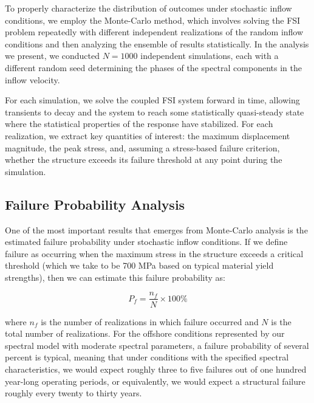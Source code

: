 ﻿\documentclass[a4paper,11pt]{article}
\theoremstyle{definition}
\begin{document}
To properly characterize the distribution of outcomes under stochastic inflow conditions, we employ the Monte-Carlo method, which involves solving the FSI problem repeatedly with different independent realizations of the random inflow conditions and then analyzing the ensemble of results statistically. In the analysis we present, we conducted $N = 1000$ independent simulations, each with a different random seed determining the phases of the spectral components in the inflow velocity.

For each simulation, we solve the coupled FSI system forward in time, allowing transients to decay and the system to reach some statistically quasi-steady state where the statistical properties of the response have stabilized. For each realization, we extract key quantities of interest: the maximum displacement magnitude, the peak stress, and, assuming a stress-based failure criterion, whether the structure exceeds its failure threshold at any point during the simulation.

\subsection{Failure Probability Analysis}

One of the most important results that emerges from Monte-Carlo analysis is the estimated failure probability under stochastic inflow conditions. If we define failure as occurring when the maximum stress in the structure exceeds a critical threshold (which we take to be 700 MPa based on typical material yield strengths), then we can estimate this failure probability as:

\begin{equation}
P_f = \frac{n_f}{N} \times 100\%
\label{eq:failure_prob}
\end{equation}

where $n_f$ is the number of realizations in which failure occurred and $N$ is the total number of realizations. For the offshore conditions represented by our spectral model with moderate spectral parameters, a failure probability of several percent is typical, meaning that under conditions with the specified spectral characteristics, we would expect roughly three to five failures out of one hundred year-long operating periods, or equivalently, we would expect a structural failure roughly every twenty to thirty years.
\end{document}
